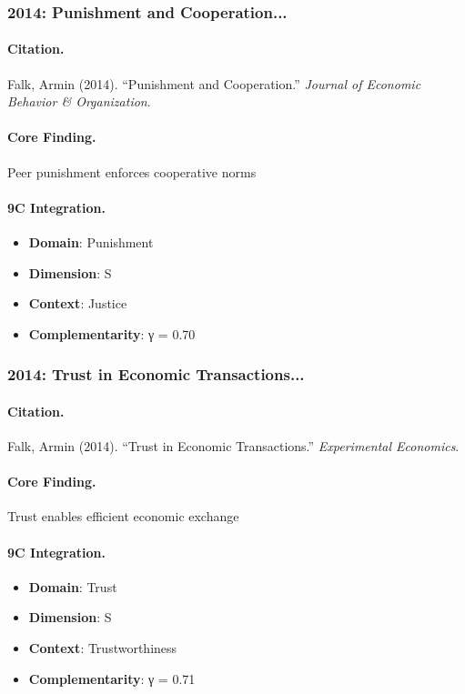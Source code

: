 \subsubsection{2014: Punishment and Cooperation...}

\paragraph{Citation.}
Falk, Armin (2014). ``Punishment and Cooperation.''
\textit{Journal of Economic Behavior & Organization}.

\paragraph{Core Finding.}
Peer punishment enforces cooperative norms

\paragraph{9C Integration.}
\begin{itemize}[nosep]
  \item \textbf{Domain}: Punishment
  \item \textbf{Dimension}: S
  \item \textbf{Context}: Justice
  \item \textbf{Complementarity}: γ = 0.70
\end{itemize}


\subsubsection{2014: Trust in Economic Transactions...}

\paragraph{Citation.}
Falk, Armin (2014). ``Trust in Economic Transactions.''
\textit{Experimental Economics}.

\paragraph{Core Finding.}
Trust enables efficient economic exchange

\paragraph{9C Integration.}
\begin{itemize}[nosep]
  \item \textbf{Domain}: Trust
  \item \textbf{Dimension}: S
  \item \textbf{Context}: Trustworthiness
  \item \textbf{Complementarity}: γ = 0.71
\end{itemize}


